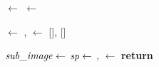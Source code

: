 \MakeRobust{\Call}

\begin{algorithmic}[1]
\label{alg:line:bodyregion} \State \body $\gets$ 
\label{alg:line:strokewidth} \State \strokewidth $\gets$  
\item[]
\label{alg:line:segmentationpoints} \State \segmentationpoints $\gets$  
\State \segmentfurther, \characters $\gets$ [\image], []
\item[]
\label{alg:line:whileCondition} 
	\label{alg:line:selectSubImage}\State $\mathit{sub\_image} \gets$  
	\label{alg:line:selectSegmentationPoint}\State $\mathit{sp} \gets$  
	\label{alg:line:split}\State \leftsubimage, \rightsubimage $\gets$ 
	\State {}
	\State {}
\EndWhile
\label{alg:line:merge}\State \textbf{return} 
\EndFunction
\end{algorithmic}